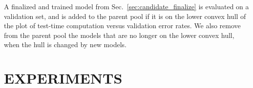 A finalized and trained model from Sec.~\ref{sec:candidate_finalize} is evaluated on a validation set, and is added to the parent pool if it is on the lower convex hull of the plot of test-time computation versus validation error rates. We also remove from the parent pool the models that are no longer on the lower convex hull, when the hull is changed by new models. 
    
\section{EXPERIMENTS}
\label{sec:nas_experiment}







